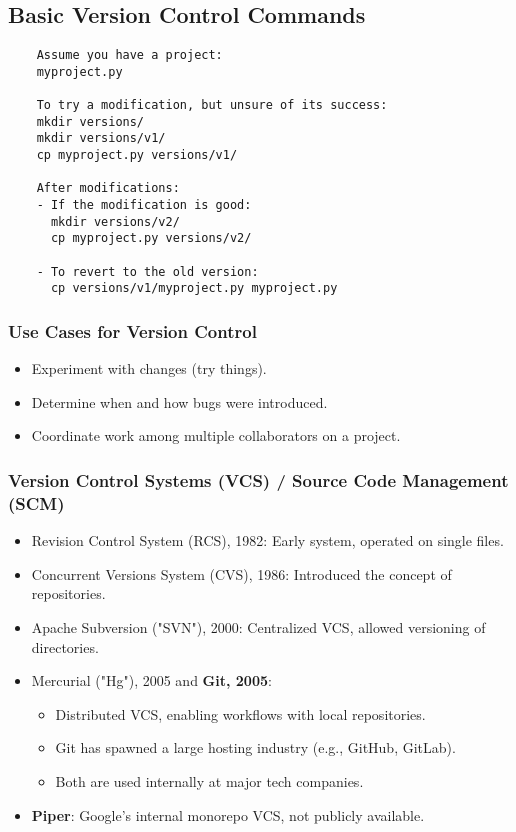 \documentclass[12pt]{article}
\begin{document}
\subsection{Basic Version Control Commands}
\begin{lstlisting}
    Assume you have a project:
    myproject.py
    
    To try a modification, but unsure of its success:
    mkdir versions/
    mkdir versions/v1/
    cp myproject.py versions/v1/
    
    After modifications:
    - If the modification is good:
      mkdir versions/v2/
      cp myproject.py versions/v2/
    
    - To revert to the old version:
      cp versions/v1/myproject.py myproject.py
\end{lstlisting}

\subsubsection{Use Cases for Version Control}
\begin{itemize}
    \item Experiment with changes (try things).
    \item Determine when and how bugs were introduced.
    \item Coordinate work among multiple collaborators on a project.
\end{itemize}

\subsubsection{Version Control Systems (VCS) / Source Code Management (SCM)}
\begin{itemize}
    \item Revision Control System (RCS), 1982: Early system, operated on single files.
    \item Concurrent Versions System (CVS), 1986: Introduced the concept of repositories.
    \item Apache Subversion ("SVN"), 2000: Centralized VCS, allowed versioning of directories.
    \item Mercurial ("Hg"), 2005 and \textbf{Git, 2005}:
    \begin{itemize}
        \item Distributed VCS, enabling workflows with local repositories.
        \item Git has spawned a large hosting industry (e.g., GitHub, GitLab).
        \item Both are used internally at major tech companies.
    \end{itemize}
    \item \textbf{Piper}: Google's internal monorepo VCS, not publicly available.
\end{itemize}
\end{document}
